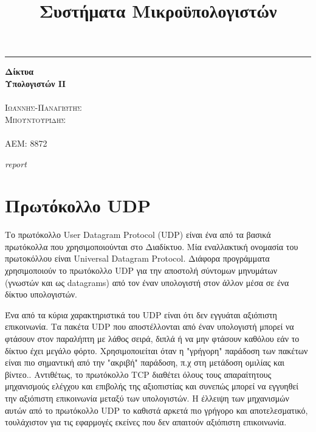 \documentclass{article}
\date{\vspace{-4ex}}
\title{Συστήματα Μικροϋπολογιστών}
\begin{document}
\begin{titlepage} %
	
	\raggedleft %
	
	\rule{1pt}{\textheight} %
	\hspace{0.05\textwidth} %
	\parbox[b]{0.75\textwidth}{ %
		
		{\Huge\bfseries Δίκτυα \\[0.5\baselineskip] Υπολογιστών ΙI}\\[2\baselineskip] %
		{\large\textit{ }}\\[4\baselineskip] %
		{\Large\textsc{Ιωάννης-Παναγιώτης \\Μπουντουρίδης}} %
	\\	\\{\large\textsc{ΑΕΜ: 8872}} %
		
		\vspace{0.5\textheight} %
		
		{\noindent \textit{report}}\\[\baselineskip] %
	}

\end{titlepage}

\newpage


\section*{Πρωτόκολλο UDP }
Το πρωτόκολλο User Datagram Protocol (UDP) είναι ένα από τα βασικά πρωτόκολλα που χρησιμοποιούνται στο Διαδίκτυο. Μία εναλλακτική ονομασία του πρωτοκόλλου είναι Universal Datagram Protocol. Διάφορα προγράμματα χρησιμοποιούν το πρωτόκολλο UDP για την αποστολή σύντομων μηνυμάτων (γνωστών και ως datagrams) από τον έναν υπολογιστή στον άλλον μέσα σε ένα δίκτυο υπολογιστών.

Ένα από τα κύρια χαρακτηριστικά του UDP είναι ότι δεν εγγυάται αξιόπιστη επικοινωνία. Τα πακέτα UDP που αποστέλλονται από έναν υπολογιστή μπορεί να φτάσουν στον παραλήπτη με λάθος σειρά, διπλά ή να μην φτάσουν καθόλου εάν το δίκτυο έχει μεγάλο φόρτο. Χρησιμοποιείται όταν η "γρήγορη" παράδοση των πακέτων είναι πιο σημαντική από την "ακριβή" παράδοση, π.χ στη μετάδοση ομιλίας και βίντεο.. Αντιθέτως, το πρωτόκολλο TCP διαθέτει όλους τους απαραίτητους μηχανισμούς ελέγχου και επιβολής της αξιοπιστίας και συνεπώς μπορεί να εγγυηθεί την αξιόπιστη επικοινωνία μεταξύ των υπολογιστών. Η έλλειψη των μηχανισμών αυτών από το πρωτόκολλο UDP το καθιστά αρκετά πιο γρήγορο και αποτελεσματικό, τουλάχιστον για τις εφαρμογές εκείνες που δεν απαιτούν αξιόπιστη επικοινωνία.
\end{document}
